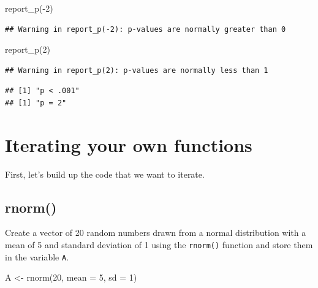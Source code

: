 \documentclass[
  oneside]{book}
\newenvironment{Shaded}{\begin{snugshade}}{\end{snugshade}}
\newcommand{\AttributeTok}[1]{\textcolor[rgb]{0.77,0.63,0.00}{#1}}
\newcommand{\DecValTok}[1]{\textcolor[rgb]{0.00,0.00,0.81}{#1}}
\newcommand{\FunctionTok}[1]{\textcolor[rgb]{0.00,0.00,0.00}{#1}}
\newcommand{\NormalTok}[1]{#1}
\newcommand{\OtherTok}[1]{\textcolor[rgb]{0.56,0.35,0.01}{#1}}
\newcommand{\SpecialCharTok}[1]{\textcolor[rgb]{0.00,0.00,0.00}{#1}}
\begin{document}
\begin{Shaded}
\begin{Highlighting}[]
\FunctionTok{report\_p}\NormalTok{(}\SpecialCharTok{{-}}\DecValTok{2}\NormalTok{)}
\end{Highlighting}
\end{Shaded}

\begin{verbatim}
## Warning in report_p(-2): p-values are normally greater than 0
\end{verbatim}

\begin{Shaded}
\begin{Highlighting}[]
\FunctionTok{report\_p}\NormalTok{(}\DecValTok{2}\NormalTok{)}
\end{Highlighting}
\end{Shaded}

\begin{verbatim}
## Warning in report_p(2): p-values are normally less than 1
\end{verbatim}

\begin{verbatim}
## [1] "p < .001"
## [1] "p = 2"
\end{verbatim}

\hypertarget{iterating-your-own-functions}{%
\section{Iterating your own functions}\label{iterating-your-own-functions}}

First, let's build up the code that we want to iterate.

\hypertarget{rnorm}{%
\subsection{rnorm()}\label{rnorm}}

Create a vector of 20 random numbers drawn from a normal distribution with a mean of 5 and standard deviation of 1 using the \texttt{rnorm()} function and store them in the variable \texttt{A}.

\begin{Shaded}
\begin{Highlighting}[]
\NormalTok{A }\OtherTok{\textless{}{-}} \FunctionTok{rnorm}\NormalTok{(}\DecValTok{20}\NormalTok{, }\AttributeTok{mean =} \DecValTok{5}\NormalTok{, }\AttributeTok{sd =} \DecValTok{1}\NormalTok{)}
\end{Highlighting}
\end{Shaded}
\end{document}
